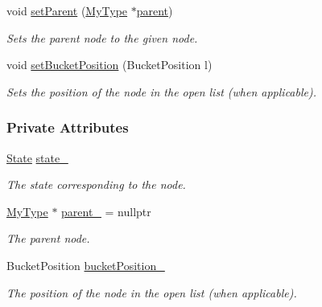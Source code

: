 \begin{DoxyCompactItemize}
void \hyperlink{structslb_1_1core_1_1sb_1_1SearchNode_a375d866400a6ea4a40098bd96610c843}{set\+Parent} (\hyperlink{structslb_1_1core_1_1sb_1_1SearchNode_ae2ea0008cdc50ebc06102fcd9e5f29d2}{My\+Type} $\ast$\hyperlink{structslb_1_1core_1_1sb_1_1SearchNode_a0ca44e44ed2c03f32a82c40a2fec2f25}{parent})
\begin{DoxyCompactList}\small\item\em Sets the parent node to the given node. \end{DoxyCompactList}\item 
void \hyperlink{structslb_1_1core_1_1sb_1_1SearchNode_a680c153c5f73e677afc2a3a3a39a68ed}{set\+Bucket\+Position} (Bucket\+Position l)
\begin{DoxyCompactList}\small\item\em Sets the position of the node in the open list (when applicable). \end{DoxyCompactList}\end{DoxyCompactItemize}
\subsubsection*{Private Attributes}
\begin{DoxyCompactItemize}
\item 
\hyperlink{structslb_1_1core_1_1sb_1_1SearchNode_a1ddf004be6dc181034b39283698985ac}{State} \hyperlink{structslb_1_1core_1_1sb_1_1SearchNode_a6a2f8f77d81321a937e607ccdb2a703e}{state\+\_\+}\hypertarget{structslb_1_1core_1_1sb_1_1SearchNode_a6a2f8f77d81321a937e607ccdb2a703e}{}\label{structslb_1_1core_1_1sb_1_1SearchNode_a6a2f8f77d81321a937e607ccdb2a703e}

\begin{DoxyCompactList}\small\item\em The state corresponding to the node. \end{DoxyCompactList}\item 
\hyperlink{structslb_1_1core_1_1sb_1_1SearchNode_ae2ea0008cdc50ebc06102fcd9e5f29d2}{My\+Type} $\ast$ \hyperlink{structslb_1_1core_1_1sb_1_1SearchNode_a337b6c4dc39204743cb335c7852064d2}{parent\+\_\+} = nullptr\hypertarget{structslb_1_1core_1_1sb_1_1SearchNode_a337b6c4dc39204743cb335c7852064d2}{}\label{structslb_1_1core_1_1sb_1_1SearchNode_a337b6c4dc39204743cb335c7852064d2}

\begin{DoxyCompactList}\small\item\em The parent node. \end{DoxyCompactList}\item 
Bucket\+Position \hyperlink{structslb_1_1core_1_1sb_1_1SearchNode_a03acf2069c912ff39e8710b422b848cc}{bucket\+Position\+\_\+}\hypertarget{structslb_1_1core_1_1sb_1_1SearchNode_a03acf2069c912ff39e8710b422b848cc}{}\label{structslb_1_1core_1_1sb_1_1SearchNode_a03acf2069c912ff39e8710b422b848cc}

\begin{DoxyCompactList}\small\item\em The position of the node in the open list (when applicable). \end{DoxyCompactList}\end{DoxyCompactItemize}


